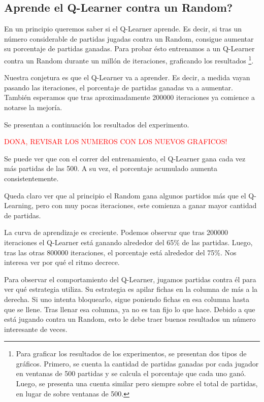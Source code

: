 \subsection{Aprende el Q-Learner contra un Random?}

En un principio queremos saber si el Q-Learner aprende. Es decir, si tras un número considerable de partidas jugadas contra un Random, consigue aumentar su porcentaje de partidas ganadas. Para probar ésto entrenamos a un Q-Learner contra un Random durante un millón de iteraciones, graficando los resultados \footnote{Para graficar los resultados de los experimentos, se presentan dos tipos de gráficos. Primero, se cuenta la cantidad de partidas ganadas por cada jugador en ventanas de 500 partidas y se calcula el porcentaje que cada uno ganó. Luego, se presenta una cuenta similar pero siempre sobre el total de partidas, en lugar de sobre ventanas de 500.}.

Nuestra conjetura es que el Q-Learner va a aprender. Es decir, a medida vayan pasando las iteraciones, el porcentaje de partidas ganadas va a aumentar. También esperamos que tras aproximadamente 200000 iteraciones ya comience a notarse la mejoría.

Se presentan a continuación los resultados del experimento.



\textcolor{red}{DONA, REVISAR LOS NUMEROS CON LOS NUEVOS GRAFICOS!}

Se puede ver que con el correr del entrenamiento, el Q-Learner gana cada vez m\'as partidas de las 500. A su vez, el porcentaje acumulado aumenta consistentemente.

Queda claro ver que al principio el Random gana algunos partidos m\'as que el Q-Learning, pero con muy pocas iteraciones, este comienza a ganar mayor cantidad de partidas.

La curva de aprendizaje es creciente. Podemos observar que tras 200000 iteraciones el Q-Learner está ganando alrededor del 65\% de las partidas. Luego, tras las otras 800000 iteraciones, el porcentaje está alrededor del 75\%. Nos interesa ver por qué el ritmo decrece.

Para observar el comportamiento del Q-Learner, jugamos partidas contra él para ver qué estrategia utiliza. Su estrategia es apilar fichas en la columna de más a la derecha. Si uno intenta bloquearlo, sigue poniendo fichas en esa columna hasta que se llene. Tras llenar esa columna, ya no es tan fijo lo que hace. Debido a que está jugando contra un Random, esto le debe traer buenos resultados un número interesante de veces.

